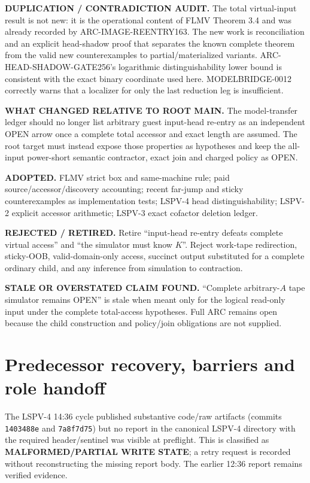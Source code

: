 \documentclass[11pt]{article}
\begin{document}
\textbf{DUPLICATION / CONTRADICTION AUDIT.} The total virtual-input result is not new: it is the operational content of FLMV Theorem 3.4 and was already recorded by ARC-IMAGE-REENTRY163. The new work is reconciliation and an explicit head-shadow proof that separates the known complete theorem from the valid new counterexamples to partial/materialized variants. ARC-HEAD-SHADOW-GATE256's logarithmic distinguishability lower bound is consistent with the exact binary coordinate used here. MODELBRIDGE-0012 correctly warns that a localizer for only the last reduction leg is insufficient.

\textbf{WHAT CHANGED RELATIVE TO ROOT MAIN.} The model-transfer ledger should no longer list arbitrary guest input-head re-entry as an independent OPEN arrow once a complete total accessor and exact length are assumed. The root target must instead expose those properties as hypotheses and keep the all-input power-short semantic contractor, exact join and charged policy as OPEN.

\textbf{ADOPTED.} FLMV strict box and same-machine rule; paid source/accessor/discovery accounting; recent far-jump and sticky counterexamples as implementation tests; LSPV-4 head distinguishability; LSPV-2 explicit accessor arithmetic; LSPV-3 exact cofactor deletion ledger.

\textbf{REJECTED / RETIRED.} Retire ``input-head re-entry defeats complete virtual access'' and ``the simulator must know $K$''. Reject work-tape redirection, sticky-OOB, valid-domain-only access, succinct output substituted for a complete ordinary child, and any inference from simulation to contraction.

\textbf{STALE OR OVERSTATED CLAIM FOUND.} ``Complete arbitrary-$A$ tape simulator remains OPEN'' is stale when meant only for the logical read-only input under the complete total-access hypotheses. Full ARC remains open because the child construction and policy/join obligations are not supplied.

\section{Predecessor recovery, barriers and role handoff}
The LSPV-4 14:36 cycle published substantive code/raw artifacts (commits \texttt{1403488e} and \texttt{7a8f7d75}) but no report in the canonical LSPV-4 directory with the required header/sentinel was visible at preflight. This is classified as \textbf{MALFORMED/PARTIAL WRITE STATE}; a retry request is recorded without reconstructing the missing report body. The earlier 12:36 report remains verified evidence.
\end{document}
